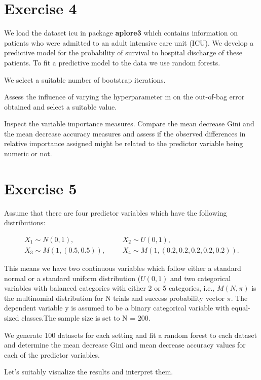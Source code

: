 \documentclass[
]{article}
\begin{document}
\section{Exercise 4}\label{exercise-4}

We load the dataset icu in package \textbf{aplore3} which contains
information on patients who were admitted to an adult intensive care
unit (ICU). We develop a predictive model for the probability of
survival to hospital discharge of these patients. To fit a predictive
model to the data we use random forests.

We select a suitable number of bootstrap iterations.

Assess the influence of varying the hyperparameter m on the out-of-bag
error obtained and select a suitable value.

Inspect the variable importance measures. Compare the mean decrease Gini
and the mean decrease accuracy measures and assess if the observed
differences in relative importance assigned might be related to the
predictor variable being numeric or not.

\section{Exercise 5}\label{exercise-5}

Assume that there are four predictor variables which have the following
distributions:

\begin{align}
X_1 \sim N(0, 1),&& &X_2 \sim U(0, 1), \\
X_3 \sim M(1, (0.5, 0.5)),&& &X_4 \sim M(1, (0.2, 0.2, 0.2, 0.2, 0.2)).
\end{align}

This means we have two continuous variables which follow either a
standard normal or a standard uniform distribution (\(U(0, 1)\) and two
categorical variables with balanced categories with either 2 or 5
categories, i.e., \(M(N, \pi)\) is the multinomial distribution for N
trials and success probability vector \(\pi\). The dependent variable y
is assumed to be a binary categorical variable with equal-sized
classes.The sample size is set to N = 200.

We generate 100 datasets for each setting and fit a random forest to
each dataset and determine the mean decrease Gini and mean decrease
accuracy values for each of the predictor variables.

Let's suitably visualize the results and interpret them.
\end{document}
